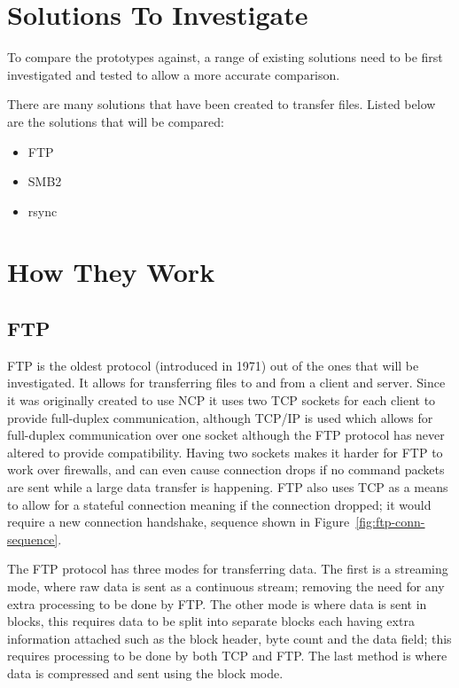\section{Solutions To Investigate}
To compare the prototypes against, a range of existing solutions need to be first investigated and tested to allow a more accurate comparison.

There are many solutions that have been created to transfer files. Listed below are the solutions that will be compared:

\begin{itemize}
	\item FTP
	\item SMB2
	\item rsync
\end{itemize}


\section{How They Work}
\subsection*{FTP}
FTP is the oldest protocol (introduced in 1971) out of the ones that will be investigated. It allows for transferring files to and from a client and server. Since it was originally created to use NCP it uses two TCP sockets for each client to provide full-duplex communication, although TCP/IP is used which allows for full-duplex communication over one socket although the FTP protocol has never altered to provide compatibility. Having two sockets makes it harder for FTP to work over firewalls, and can even cause connection drops if no command packets are sent while a large data transfer is happening. FTP also uses TCP as a means to allow for a stateful connection meaning if the connection dropped; it would require a new connection handshake, sequence shown in Figure~\ref{fig:ftp-conn-sequence}.

The FTP protocol has three modes for transferring data. The first is a streaming mode, where raw data is sent as a continuous stream; removing the need for any extra processing to be done by FTP. The other mode is where data is sent in blocks, this requires data to be split into separate blocks each having extra information attached such as the block header, byte count and the data field; this requires processing to be done by both TCP and FTP. The last method is where data is compressed and sent using the block mode.

